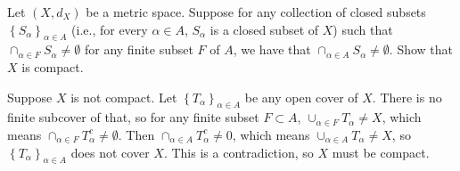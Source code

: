 \documentclass{article}
\begin{document}
\bigskip
\begin{prob}
    Let $(X, d_X)$ be a metric space. Suppose for any collection of closed subsets $ \left\{ S_\alpha \right\}_{\alpha \in A}$ (i.e., for every $\alpha \in A$, $S_\alpha$ is a closed subset of $X$) such that $\cap_{\alpha \in F} S_\alpha \neq \emptyset$ for any finite subset $F$ of $A$, we have that $\cap_{\alpha \in A} S_\alpha \neq \emptyset$. Show that $X$ is compact.
\end{prob}
Suppose $X$ is not compact. Let $ \left\{ T_\alpha \right\}_{\alpha \in A}$ be any open cover of $X$. There is no finite subcover of that, so for any finite subset $F \subset A$, $ \cup_{\alpha \in F} T_\alpha \neq X$, which means $\cap_{\alpha \in F} T_\alpha^c \neq \emptyset$. Then $\cap_{\alpha \in A} T_\alpha^c \neq 0$, which means $ \cup_{\alpha \in A} T_\alpha \neq X$, so $ \left\{ T_\alpha \right\}_{\alpha \in A}$ does not cover $X$. This is a contradiction, so $X$ must be compact.
\end{document}

